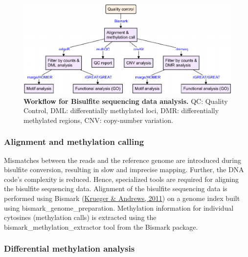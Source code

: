 \documentclass[12pt,twoside]{reedthesis}
\begin{document}
\begin{figure}[h]

{\centering \includegraphics{thesis_files/figure-latex/mf7-1} 

}

\caption[Workflow for Bisulfite sequencing data analysis]{\textbf{Workflow for Bisulfite sequencing data analysis.} QC: Quality Control, DML: differentially methylated loci, DMR: differentially methylated regions, CNV: copy-number variation.}\label{fig:mf7}
\end{figure}
\hypertarget{m3.5.1}{%
\subsubsection*{Alignment and methylation calling}\label{m3.5.1}}

Mismatches between the reads and the reference genome are introduced
during bisulfite conversion, resulting in slow and imprecise mapping.
Further, the DNA code's complexity is reduced. Hence, specialized tools
are required for aligning the bisulfite sequencing data. Alignment of
the bisulfite sequencing data is performed using Bismark (\protect\hyperlink{ref-krueger2011}{Krueger \& Andrews, 2011})
on a genome index built using bismark\_genome\_preparation. Methylation
information for individual cytosines (methylation calls) is extracted
using the bismark\_methylation\_extractor tool from the Bismark package.

\hypertarget{m3.5.2}{%
\subsubsection*{Differential methylation analysis}\label{m3.5.2}}
\end{document}
